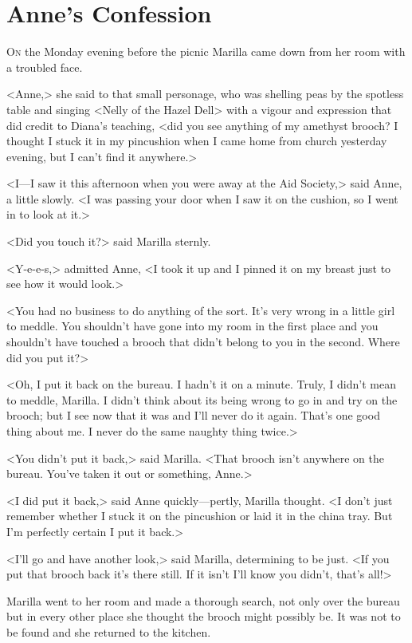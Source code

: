\chapter{Anne's Confession}

\lettrine{O}{n} the Monday evening before the picnic Marilla came down from her room with a troubled face.

\zz
<Anne,> she said to that small personage, who was shelling peas by the spotless table and singing <Nelly of the Hazel Dell> with a vigour and expression that did credit to Diana's teaching, <did you see anything of my amethyst brooch? I thought I stuck it in my pincushion when I came home from church yesterday evening, but I can't find it anywhere.>

<I—I saw it this afternoon when you were away at the Aid Society,> said Anne, a little slowly. <I was passing your door when I saw it on the cushion, so I went in to look at it.>

<Did you touch it?> said Marilla sternly.

<Y-e-e-s,> admitted Anne, <I took it up and I pinned it on my breast just to see how it would look.>

<You had no business to do anything of the sort. It's very wrong in a little girl to meddle. You shouldn't have gone into my room in the first place and you shouldn't have touched a brooch that didn't belong to you in the second. Where did you put it?>

<Oh, I put it back on the bureau. I hadn't it on a minute. Truly, I didn't mean to meddle, Marilla. I didn't think about its being wrong to go in and try on the brooch; but I see now that it was and I'll never do it again. That's one good thing about me. I never do the same naughty thing twice.>

<You didn't put it back,> said Marilla. <That brooch isn't anywhere on the bureau. You've taken it out or something, Anne.>

<I did put it back,> said Anne quickly—pertly, Marilla thought. <I don't just remember whether I stuck it on the pincushion or laid it in the china tray. But I'm perfectly certain I put it back.>

<I'll go and have another look,> said Marilla, determining to be just. <If you put that brooch back it's there still. If it isn't I'll know you didn't, that's all!>

Marilla went to her room and made a thorough search, not only over the bureau but in every other place she thought the brooch might possibly be. It was not to be found and she returned to the kitchen.

